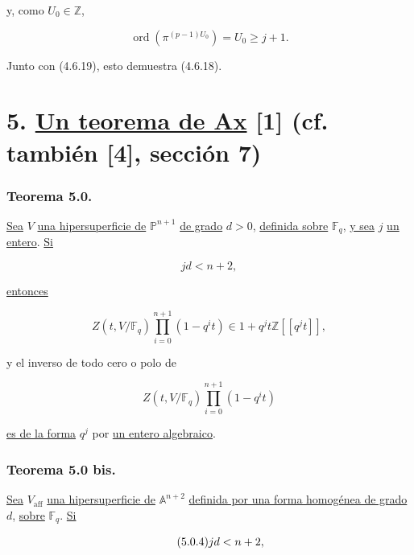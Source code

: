 y, como $U_0\in\mathbb Z$,

\begin{equation}\tag{4.6.23}
\operatorname{ord}\!\left(\pi^{(p-1)U_0}\right)
=U_0\geq j+1.
\end{equation}

Junto con (4.6.19), esto demuestra (4.6.18).

\pageoriginale

\section*{5. \underline{Un teorema de Ax} [1] (cf. también [4], sección 7)}

\subsubsection*{Teorema 5.0.}
\underline{Sea} $V$ \underline{una hipersuperficie de} $\mathbb P^{n+1}$ \underline{de grado} $d>0$,
\underline{definida sobre} $\mathbb F_q$, \underline{y sea} $j$ \underline{un entero}. \underline{Si}

\begin{equation}\tag{5.0.1}
jd<n+2,
\end{equation}

\underline{entonces}

\begin{equation}\tag{5.0.2}
Z(t,V/\mathbb F_q)\prod_{i=0}^{n+1}(1-q^it)
\in1+q^jt\mathbb Z[[q^jt]],
\end{equation}

y el inverso de todo cero o polo de

\begin{equation}\tag{5.0.3}
Z(t,V/\mathbb F_q)\prod_{i=0}^{n+1}(1-q^it)
\end{equation}

\underline{es de la forma} $q^j$ por \underline{un entero algebraico}.

\subsubsection*{Teorema 5.0 bis.}
\underline{Sea} $V_{\mathrm{aff}}$ \underline{una hipersuperficie de} $\mathbb A^{n+2}$ \underline{definida
por una forma homogénea de grado} $d$, \underline{sobre} $\mathbb F_q$. \underline{Si}

\begin{equation}\tag{\sisi{5.0.7}{5.0.4}}
jd<n+2,
\end{equation}

